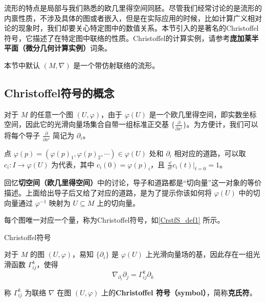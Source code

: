 


流形的特点是局部与我们熟悉的欧几里得空间同胚。尽管我们经常讨论的是流形的内禀性质，不涉及具体的图或者嵌入，但是在实际应用的时候，比如计算广义相对论的现象时，我们却要关心特定图中的数值关系。本节引入的是著名的Christoffel符号，它描述了在特定图中联络的性质。Christoffel的计算实例，请参考\textbf{庞加莱半平面（微分几何计算实例）}词条。

本节中默认 $(M, \nabla)$ 是一个带仿射联络的流形。


\subsection{Christoffel符号的概念}\label{CrstfS_sub1}

对于 $M$ 的任意一个图 $(U, \varphi)$，由于 $\varphi(U)$ 是一个欧几里得空间，即实数坐标空间，因此它的光滑向量场集合自带一组标准正交基 $\{\frac{\partial}{\partial x^i}\}$。为方便计，我们可以将每个导子 $\frac{\partial}{\partial x^i}$ 简记为 $\partial_i$。

点 $\varphi(p)=(\varphi(p)_1, \varphi(p)_2, \cdots)\in\varphi(U)$ 处和 $\partial_i$ 相对应的道路，可以取 $c_i:I\to \varphi(U)$ 为代表，其中 $c_i(0)=\varphi(p)_i$，且 $\frac{\dd}{\dd t}c_i(t)|_{t=0}=1$。

回忆\textbf{切空间（欧几里得空间）}中的讨论，导子和道路都是“切向量”这一对象的等价描述。上面给出导子后又给了对应的道路，是为了提示你该如何将 $\varphi(U)$ 中的切向量通过 $\varphi^{-1}$ 映射为 $U\subseteq M$ 上的切向量。

每个图唯一对应一个量，称为Christoffel符号，如\autoref{CrstfS_def1} 所示。

\begin{definition}{Christoffel符号}\label{CrstfS_def1}

对于 $M$ 的图 $(U, \varphi)$，易知 $\{\partial_i\}$ 是 $\varphi(U)$ 上光滑向量场的基，因此存在一组光滑函数 $\Gamma^k_{ij}$，使得
\begin{equation}
\nabla_{\partial_i}\partial_j=\Gamma^k_{ij}\partial_k
\end{equation}

称 $\Gamma^k_{ij}$ 为联络 $\nabla$ 在图 $(U, \varphi)$ 上的\textbf{Christoffel 符号（symbol）}，简称\textbf{克氏符}。
\end{definition}

